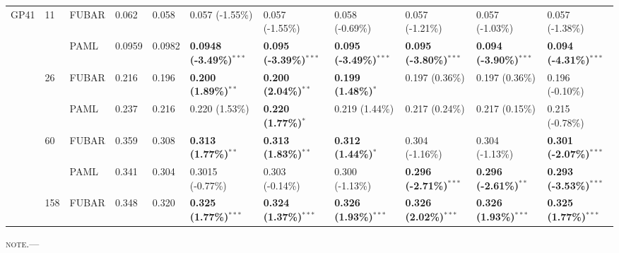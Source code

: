 \documentclass[11pt]{article}
\begin{document}
\begin{sidewaystable}[htbp]
\begin{adjustwidth}{-2.25cm}{}
\begin{tabular}{l l l l l l l l l l l}
GP41  &  11 &  FUBAR  &  0.062  &  0.058  &  0.057 (-1.55\%)  &  0.057 (-1.55\%)  &  0.058 (-0.69\%)  &  0.057 (-1.21\%)  &  0.057 (-1.03\%)  &  0.057 (-1.38\%)  \\
  &    &  PAML        &  0.0959  &  0.0982  &  \textbf{0.0948 (-3.49\%)}$^{\ast\ast\ast}$  &  \textbf{0.095 (-3.39\%)}$^{\ast\ast\ast}$  &  \textbf{0.095 (-3.49\%)}$^{\ast\ast\ast}$  &  \textbf{0.095 (-3.80\%)}$^{\ast\ast\ast}$  &  \textbf{0.094 (-3.90\%)}$^{\ast\ast\ast}$  &  \textbf{0.094 (-4.31\%)}$^{\ast\ast\ast}$  \\
\hline
  &  26  &  FUBAR     &  0.216  &  0.196  &  \textbf{0.200 (1.89\%)}$^{\ast\ast}$  &  \textbf{0.200 (2.04\%)}$^{\ast\ast}$  &  \textbf{0.199 (1.48\%)}$^{\ast}$  &  0.197 (0.36\%)  &  0.197 (0.36\%)  &  0.196 (-0.10\%)  \\ 
  &    &  PAML        &  0.237  &  0.216  &  0.220 (1.53\%)  &  \textbf{0.220 (1.77\%)}$^{\ast}$  &  0.219 (1.44\%)  &  0.217 (0.24\%)  &  0.217 (0.15\%)  &  0.215 (-0.78\%)  \\ 
\hline
  &  60  &  FUBAR     &  0.359  &  0.308  &  \textbf{0.313 (1.77\%)}$^{\ast\ast}$  &  \textbf{0.313 (1.83\%)}$^{\ast\ast}$  &  \textbf{0.312 (1.44\%)}$^{\ast}$  &  0.304 (-1.16\%)  &  0.304 (-1.13\%)  &  \textbf{0.301 (-2.07\%)}$^{\ast\ast\ast}$  \\
  &    &  PAML        &  0.341  &  0.304  &  0.3015 (-0.77\%)  &  0.303 (-0.14\%)  &  0.300 (-1.13\%)  &  \textbf{0.296 (-2.71\%)}$^{\ast\ast\ast}$  &  \textbf{0.296 (-2.61\%)}$^{\ast\ast}$  &  \textbf{0.293 (-3.53\%)}$^{\ast\ast\ast}$  \\
\hline
  &  158  &  FUBAR    &  0.348  &  0.320  &  \textbf{0.325 (1.77\%)}$^{\ast\ast\ast}$  &  \textbf{0.324 (1.37\%)}$^{\ast\ast\ast}$  &  \textbf{0.326 (1.93\%)}$^{\ast\ast\ast}$  &  \textbf{0.326 (2.02\%)}$^{\ast\ast\ast}$  &  \textbf{0.326 (1.93\%)}$^{\ast\ast\ast}$  &  \textbf{0.325 (1.77\%)}$^{\ast\ast\ast}$  \\
\hline\end{tabular}
\newline
\textsc{note.}--- %
\end{adjustwidth}
\end{sidewaystable}
\end{document}
